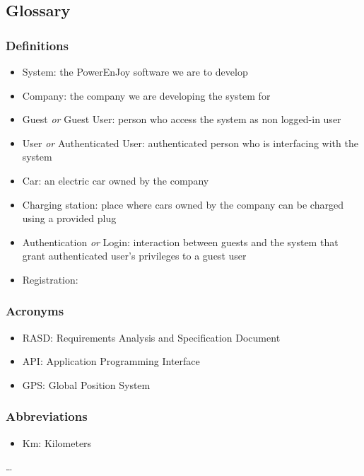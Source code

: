 \subsection{Glossary}
	\subsubsection{Definitions}
	\begin{itemize}
		\item System: the PowerEnJoy software we are to develop
		\item Company: the company we are developing the system for
		\item Guest \emph{or} Guest User: person who access the system as non logged-in user
		\item User \emph{or} Authenticated User: authenticated person who is interfacing with the system
		\item Car: an electric car owned by the company
		\item Charging station: place where cars owned by the company can be charged using a provided plug
		\item Authentication \emph{or} Login: interaction between guests and the system that grant authenticated user's privileges to a guest user
		\item Registration: 
	\end{itemize}
\subsubsection{Acronyms}
	\begin{itemize}
		\item RASD: Requirements Analysis and Specification Document
		\item API: Application Programming Interface
		\item GPS: Global Position System
	\end{itemize}
\subsubsection{Abbreviations}
	\begin{itemize}
		\item Km: Kilometers
	\end{itemize}
 \ldots
